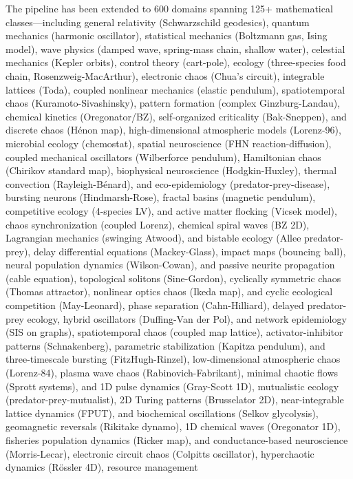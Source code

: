 \documentclass{article}
\begin{document}
The pipeline has been extended to 600 domains spanning 125+ mathematical
classes---including
general relativity (Schwarzschild geodesics), quantum mechanics (harmonic
oscillator), statistical mechanics (Boltzmann gas, Ising model), wave
physics (damped wave, spring-mass chain, shallow water), celestial mechanics (Kepler
orbits), control theory (cart-pole), ecology (three-species food chain,
Rosenzweig-MacArthur), electronic chaos (Chua's circuit), integrable lattices
(Toda), coupled nonlinear mechanics (elastic pendulum), spatiotemporal chaos
(Kuramoto-Sivashinsky), pattern formation (complex Ginzburg-Landau), chemical
kinetics (Oregonator/BZ), self-organized criticality (Bak-Sneppen), and
discrete chaos (H\'enon map), high-dimensional atmospheric models (Lorenz-96),
microbial ecology (chemostat), spatial neuroscience (FHN reaction-diffusion),
coupled mechanical oscillators (Wilberforce pendulum), Hamiltonian chaos
(Chirikov standard map), biophysical neuroscience (Hodgkin-Huxley),
thermal convection (Rayleigh-B\'enard), and eco-epidemiology
(predator-prey-disease), bursting neurons (Hindmarsh-Rose), fractal basins
(magnetic pendulum), competitive ecology (4-species LV), and active matter
flocking (Vicsek model), chaos synchronization (coupled Lorenz), chemical spiral waves
(BZ 2D), Lagrangian mechanics (swinging Atwood), and bistable ecology
(Allee predator-prey), delay differential equations (Mackey-Glass),
impact maps (bouncing ball), neural population dynamics (Wilson-Cowan),
and passive neurite propagation (cable equation), topological solitons
(Sine-Gordon), cyclically symmetric chaos (Thomas attractor), nonlinear
optics chaos (Ikeda map), and cyclic ecological competition
(May-Leonard), phase separation (Cahn-Hilliard), delayed predator-prey
ecology, hybrid oscillators (Duffing-Van der Pol), and network epidemiology
(SIS on graphs), spatiotemporal chaos (coupled map lattice), activator-inhibitor
patterns (Schnakenberg), parametric stabilization (Kapitza pendulum), and
three-timescale bursting (FitzHugh-Rinzel), low-dimensional atmospheric chaos
(Lorenz-84), plasma wave chaos (Rabinovich-Fabrikant), minimal chaotic flows
(Sprott systems), and 1D pulse dynamics (Gray-Scott 1D), mutualistic ecology
(predator-prey-mutualist), 2D Turing patterns (Brusselator 2D), near-integrable
lattice dynamics (FPUT), and biochemical oscillations
(Selkov glycolysis), geomagnetic reversals (Rikitake dynamo), 1D chemical
waves (Oregonator 1D), fisheries population dynamics (Ricker map), and
conductance-based neuroscience (Morris-Lecar), electronic circuit chaos
(Colpitts oscillator), hyperchaotic dynamics (R\"ossler 4D), resource management
\end{document}
